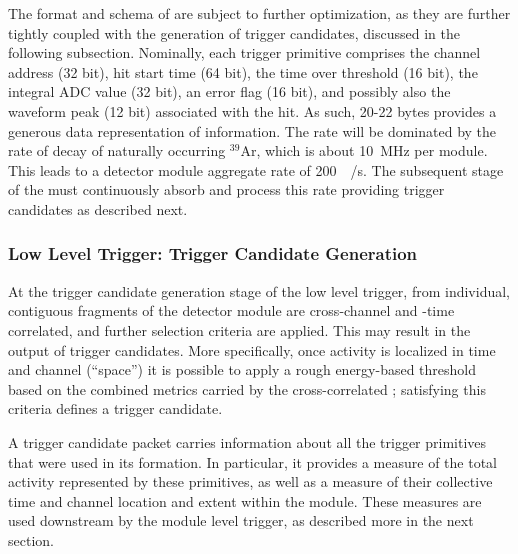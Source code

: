 The format and schema of  are subject to further
optimization, as they are further tightly coupled with the generation of
trigger candidates, discussed in the following subsection. Nominally,
each trigger primitive comprises the channel address (32 bit), hit
start time (64 bit), the time over
threshold (16 bit), the integral ADC value (32 bit), an error flag (16
bit), and possibly also
the waveform peak (12 bit) associated with the hit. 
As such, 20-22 bytes provides a generous data
representation of  information. 
The  rate will be dominated by the rate of decay of naturally occurring
$^{39}$Ar, which is about \SI{10}{\mega\hertz} per module.
This leads to a detector module aggregate rate of
\SI{200}{\mega\byte/\second}.
The subsequent stage of the  must continuously absorb and process this
rate providing trigger candidates as described next.


\subsubsection{Low Level Trigger: Trigger Candidate Generation}

At the trigger candidate generation stage of the low level trigger,
 from individual, contiguous fragments of the
detector 
module are cross-channel and -time correlated, and further selection
criteria are applied. This may result in the
output of trigger candidates. 
More specifically, once activity is localized in time and channel (``space'') it is
possible to apply a rough energy-based threshold based on the combined
metrics carried by the cross-correlated ;
satisfying this criteria defines a trigger candidate. 

A trigger candidate packet carries information about all the trigger
primitives that were used in its formation. 
In particular, it provides a measure of the total activity represented
by these primitives, as well as a measure of their collective time and channel
location and extent within the module.
These measures are used downstream by the module level trigger, 
as described more in the next section.


